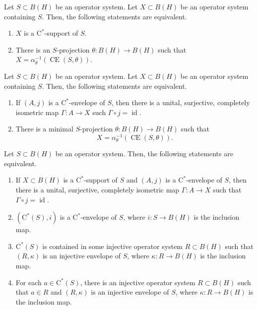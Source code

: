 \documentclass[10pt,a4paper]{amsart}
\newcommand{\CE}{\operatorname{CE}}
\newcommand{\id}{\operatorname{id}}
\newcommand{\rC}{\mathrm{C}}
\begin{document}
\begin{theorem}\label{T:Cstarext}
Let $S\subset B(H)$  be an operator system. Let $X\subset B(H)$ be an operator system containing $S$. Then, the following statements are equivalent.
\begin{enumerate}[{\rm (i)}]
\item $X$ is a $\rC^*$-support of $S$.
\item There is an $S$-projection $\theta:B(H)\to B(H)$ such that  $X=\alpha_\theta^{-1}(\CE(S,\theta))$.
\end{enumerate}
\end{theorem} 

\begin{corollary}\label{C:coversenv}
Let $S\subset B(H)$  be an operator system. Let $X\subset B(H)$ be an operator system containing $S$.  Then, the following statements are equivalent.
\begin{enumerate}[{\rm (i)}]
\item If $(A,j)$ is a $\rC^*$-envelope of $S$, then there is a unital, surjective, completely isometric map  $\Gamma:A\to X$ such $\Gamma\circ j=\id$. 
\item There is a minimal $S$-projection $\theta:B(H)\to B(H)$ such that  \[X=\alpha_\theta ^{-1}(\CE(S,\theta)).\]
\end{enumerate}
\end{corollary} 

\begin{theorem}\label{T:Shtrivial}
Let $S\subset B(H)$  be an operator system. Then, the following statements are equivalent.
\begin{enumerate}[{\rm (i)}]
\item If $X\subset B(H)$ is a $\rC^*$-support of $S$ and $(A,j)$ is a $\rC^*$-envelope of $S$, then there is a unital, surjective, completely isometric map $\Gamma:A\to X$ such that $\Gamma\circ j=\id$. 
\item $(\rC^*(S),i)$ is a  $\rC^*$-envelope of $S$, where $i:S\to B(H)$ is the inclusion map.
\item $\rC^*(S)$ is contained in some injective operator system $R\subset B(H)$  such that $(R,\kappa)$ is an injective envelope of $S$, where $\kappa:R\to B(H)$ is the inclusion map.
\item For each $a\in \rC^*(S)$, there is an injective operator system $R\subset B(H)$  such that $a\in R$ and $(R,\kappa)$ is an injective envelope of $S$, where $\kappa:R\to B(H)$ is the inclusion map.
\end{enumerate}
\end{theorem}
\end{document}
